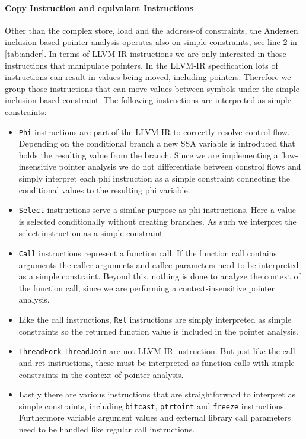\paragraph{Copy Instruction and equivalant Instructions}
Other than the complex store, load and the address-of constraints, the Andersen inclusion-based pointer analysis operates also on simple constraints, see line 2 in \autoref{tab:ander}. In terms of LLVM-IR instructions we are only interested in those instructions that manipulate pointers. In the LLVM-IR specification lots of instructions can result in values being moved, including pointers. Therefore we group those instructions that can move values between symbols under the simple inclusion-based constraint.
The following instructions are interpreted as simple constraints:
\begin{itemize}
    \item \verb|Phi| instructions are part of the LLVM-IR to correctly resolve control flow. Depending on the conditional branch a new SSA variable is introduced that holds the resulting value from the branch.
          Since we are implementing a flow-insensitive pointer analysis we do not differentiate between constrol flows and simply interpret each phi instruction as a simple constraint connecting the conditional values to the resulting phi variable.
    \item \verb|Select| instructions serve a similar purpose as phi instructions. Here a value is selected conditionally without creating branches. As such we interpret the select instruction as a simple constraint.
    \item \verb|Call| instructions represent a function call. If the function call contains arguments the caller arguments and callee parameters need to be interpreted as a simple constraint. Beyond this, nothing is done to analyze the context of the function call, since we are performing a context-insensitive pointer analysis.
    \item Like the call instructions, \verb|Ret| instructions are simply interpreted as simple constraints so the returned function value is included in the pointer analysis.
    \item \verb|ThreadFork| \verb|ThreadJoin| are not LLVM-IR instruction. But just like the call and ret instructions, these must be interpreted as function calls with simple constraints in the context of pointer analysis.
    \item Lastly there are various instructions that are straightforward to interpret as simple constraints, including \verb|bitcast|, \verb|ptrtoint| and \verb|freeze| instructions. Furthermore variable argument values and external library call parameters need to be handled like regular call instructions.
\end{itemize}

